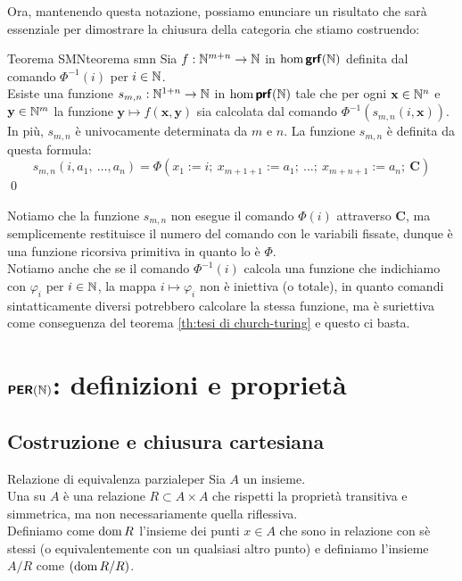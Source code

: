 \documentclass[openany]{book}
\begin{document}
Ora, mantenendo questa notazione, possiamo enunciare un risultato che sarà essenziale per dimostrare la chiusura della categoria che stiamo costruendo:

\begin{theorem}{Teorema SMN}{teorema smn}
    Sia $f : \mathbb{N}^{m+n} \to \mathbb{N}$ in $\hom\text{\sffamily\textbf{grf}}(\mathbb{N})$ definita dal comando $\Phi^{-1}(i)$ per $i \in \mathbb{N}$.\\
    Esiste una funzione $s_{m,n}: \mathbb{N}^{1+n} \to \mathbb{N}$ in $\hom\text{\sffamily\textbf{prf}}(\mathbb{N})$ tale che per ogni $\mathbf{x} \in \mathbb{N}^n$ e $\mathbf{y}\in \mathbb{N}^m$ la funzione $\mathbf{y}\mapsto f(\mathbf{x},\mathbf{y})$ sia calcolata dal comando $\Phi^{-1}(s_{m,n}(i,\mathbf{x}))$.\\
    In più, $s_{m,n}$ è univocamente determinata da $m$ e $n$.
    \proof 
    La funzione $s_{m,n}$ è definita da questa formula:
    \[ s_{m,n}(i,a_1,\ \dots,a_n) = \Phi\left(x_1:= i;\ x_{m+1+1} := a_1;\ \dots;\ x_{m+n+1} := a_n ;\ \mathbf{C} \right) \]
    \qed
\end{theorem}

Notiamo che la funzione $s_{m,n}$ non esegue il comando $\Phi(i)$ attraverso $\mathbf{C}$, ma semplicemente restituisce il numero del comando con le variabili fissate, dunque è una funzione ricorsiva primitiva in quanto lo è $\Phi$.\\
Notiamo anche che se il comando $\Phi^{-1}(i)$ calcola una funzione che indichiamo con $\varphi_i$ per $i \in \mathbb{N}$, la mappa $i\mapsto \varphi_i$ non è iniettiva (o totale), in quanto comandi sintatticamente diversi potrebbero calcolare la stessa funzione, ma è suriettiva come conseguenza del teorema \cref{th:tesi di church-turing} e questo ci basta.

\newpage
\section{$\text{\sffamily\textbf{PER}}(\mathbb{N})$: definizioni e proprietà}

\subsection{Costruzione e chiusura cartesiana}

\begin{definition}{Relazione di equivalenza parziale}{per}
    Sia $A$ un insieme.\\
    Una  su $A$ è una relazione $R\subset A\times A$ che rispetti la proprietà transitiva e simmetrica, ma non necessariamente quella riflessiva.\\
    Definiamo come $\operatorname{dom} R$ l'insieme dei punti $x \in A$ che sono in relazione con sè stessi (o equivalentemente con un qualsiasi altro punto) e definiamo l'insieme $A/R$ come $(\operatorname{dom} R/R)$.
\end{definition}
\end{document}
